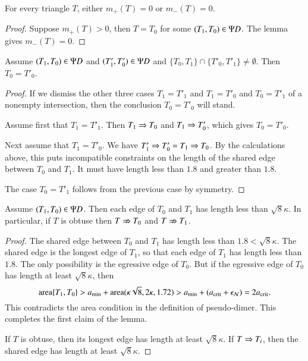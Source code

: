 \begin{corollary}  
  For every triangle $T$, either $m_+(T)=0$ or $m_-(T)=0$.
\end{corollary}

\begin{proof}  
  Suppose $m_+(T)>0$, then $T=T_0$ for some $(T_1,T_0)\in\Psi D$.  The
  lemma gives $m_-(T)=0$.
\end{proof}

\begin{lemma}  
  Assume $(T_1,T_0)\in \Psi D$ and $(T'_1,T'_0)\in\Psi D$ and
  $\{T_0,T_1\}\cap\{T'_0,T'_1\} \ne \emptyset$.  Then $T_0 = T'_0$.
\end{lemma}

\begin{proof}  
  If we dismiss the other three cases $T_1=T'_1$ and $T_1=T'_0$ and
  $T_0=T'_1$ of a nonempty intersection, then the conclusion $T_0 =
  T'_0$ will stand.

  Assume first that $T_1 = T'_1$.  Then $T_1\Rightarrow T_0$ and $T_1\Rightarrow
  T'_0$, which gives $T_0=T'_0$.

  Next assume that $T_1=T'_0$.  We have $T'_1\Rightarrow T'_0 = T_1 \Rightarrow T_0$.
  By the calculations above, this puts incompatible constraints on the
  length of the shared edge between $T_0$ and $T_1$.  It must have
  length less than $1.8$ and greater than $1.8$.

  The case $T_0=T'_1$ follows from the previous case by symmetry.
\end{proof}

\begin{lemma}
  Assume $(T_1,T_0)\in\Psi D$.  Then each edge of $T_0$ and $T_1$ has
  length less than $\sqrt8\kappa$.  In particular, if $T$ is obtuse
  then $T\nRightarrow T_0$ and $T \nRightarrow T_1$.
\end{lemma}

\begin{proof} 
  The shared edge between $T_0$ and $T_1$ has length less than $1.8 <
  \sqrt8\kappa$.  The shared edge is the longest edge of $T_1$, so
  that each edge of $T_1$ has length less than $1.8$.  The only
  possibility is the egressive edge of $T_0$.  But if the egressive
  edge of $T_0$ has length at least $\sqrt8\kappa$, then
\[
{\operatorname{area}}\{T_1,T_0\} > a_\text{min} + {\operatorname{area}}(\kappa\sqrt8,2\kappa,1.72) 
> a_\text{min} + (a_\text{crit} + \epsilon_{\mathcal N}) = 2a_\text{crit}.
\]
This contradicts the area condition in the definition of pseudo-dimer.
This completes the first claim of the lemma.

If $T$ is obtuse, then its longest edge has length at least
$\sqrt8\kappa$.  If $T\Rightarrow T_i$, then the shared edge has length at
least $\sqrt8\kappa$.
\end{proof}

